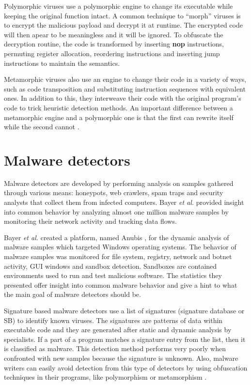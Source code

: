 Polymorphic viruses use a polymorphic engine to change its executable while keeping the original function intact. A common technique to ``morph'' viruses is to encrypt the malicious payload and decrypt it at runtime. The encrypted code will then apear to be meaningless and it will be ignored. To obfuscate the decryption routine, the code is transformed by inserting \textbf{nop} instructions, permuting register allocation, reordering instructions and inserting jump instructions to maintain the semantics.

Metamorphic viruses also use an engine to change their code in a variety of ways, such as code transposition and substituting instruction sequences with equivalent ones. In addition to this, they interweave their code with the original program's code to trick heuristic detection methods. An important difference between a metamorphic engine and a polymorphic one is that the first can rewrite itself while the second cannot \cite{testing-mal-det}.

\section{Malware detectors}
\label{sec:mal-detectors}

Malware detectors are developed by performing analysis on samples gathered through various means: honeypots, web crawlers, spam traps and security analysts that collect them from infected computers. Bayer \textit{et al.} \cite{current-mal-behavior} provided insight into common behavior by analyzing almost one million malware samples by monitoring their network activity and tracking data flows.

Bayer \textit{et al.} created a platform, named Anubis \cite{anubis-platform}, for the dynamic analysis of malware samples which targeted Windows operating systems. The behavior of malware samples was monitored for file system, registry, network and botnet activity, GUI windows and sandbox detection. Sandboxes are contained environments used to run and test malicious software. The statistics they presented offer insight into common malware behavior and give a hint to what the main goal of malware detectors should be.

Signature based malware detectors use a list of signatures (signature database or SB) to identify known viruses. The signatures are patterns of data within executable code and they are generated after static and dynamic analysis by specialists. If a part of a program matches a signature entry from the list, then it is classified as malware. This detection method performs very poorly when confronted with new samples because the signature is unknown. Also, malware writers can easily avoid detection from this type of detectors by using obfuscation techniques in their programs, like polymorphism or metamorphism \cite{mining-specifications}. 

